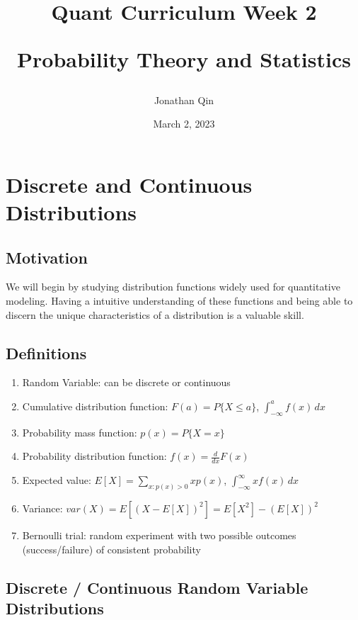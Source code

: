 \documentclass{article}
\title{

\begin{center} \textbf{Quant Curriculum Week 2}

Probability Theory and Statistics \end{center}
}
\author{Jonathan Qin}
\date{March 2, 2023}
\begin{document}
\maketitle

\section{Discrete and Continuous Distributions}

\subsection{Motivation}
We will begin by studying distribution functions widely used for quantitative modeling. Having a intuitive understanding of these functions and being able to discern the unique characteristics of a distribution is a valuable skill. 

\subsection{Definitions}
\begin{enumerate}
    \item Random Variable: can be discrete or continuous
    \item Cumulative distribution function: \(F(a) = P\{X \leq a\}\), \(\int_{-\infty}^{a} f(x) \,dx\)
    \item Probability mass function: \(p(x) = P\{X=x\}\) 
    \item Probability distribution function: \(f(x) = \frac{d}{dx}F(x)\)
    \item Expected value: \(E[X] = \sum_{x:p(x)>0} xp(x)\), \(\int_{-\infty}^{\infty} xf(x) \,dx\)
    \item Variance: \(var(X) = E[(X-E[X])^2] = E[X^2] - (E[X])^2\)
    \item Bernoulli trial: random experiment with two possible outcomes (success/failure) of consistent probability
\end{enumerate}

\subsection{Discrete / Continuous Random Variable Distributions}
\end{document}
